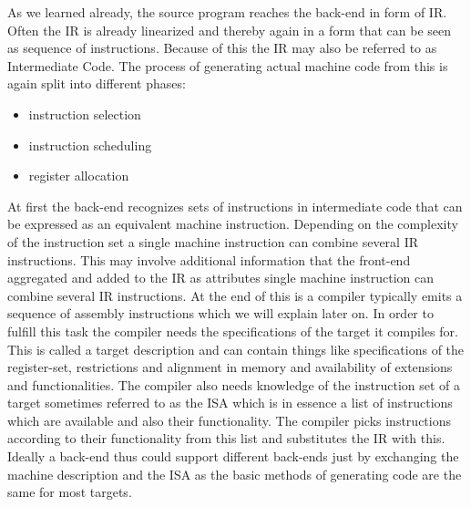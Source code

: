 As we learned already, the source program reaches the back-end in form of IR.
Often the IR is already linearized and thereby again in a form that can be seen as sequence of instructions.
Because of this the IR may also be referred to as Intermediate Code.
The process of generating actual machine code from this is again split into different phases:
\begin{itemize}
    \item instruction selection
    \item instruction scheduling
    \item register allocation
\end{itemize}

At first the back-end recognizes sets of instructions in intermediate code that can be expressed as an equivalent machine instruction.
Depending on the complexity of the instruction set a single machine instruction can combine several IR instructions.
This may involve additional information that the front-end aggregated and added to the IR as attributes single machine instruction can combine several IR instructions.
At the end of this is a compiler typically emits a sequence of assembly instructions which we will explain later on.
In order to fulfill this task the compiler needs the specifications of the target it compiles for.
This is called a target description and can contain things like specifications of the register-set, restrictions and alignment in memory and availability of extensions and functionalities.
The compiler also needs knowledge of the instruction set of a target sometimes referred to as the ISA which is in essence a list of instructions which are available and also their functionality.
The compiler picks instructions according to their functionality from this list and substitutes the IR with this.
Ideally a back-end thus could support different back-ends just by exchanging the machine description and the ISA as the basic methods of generating code are the same for most targets.

